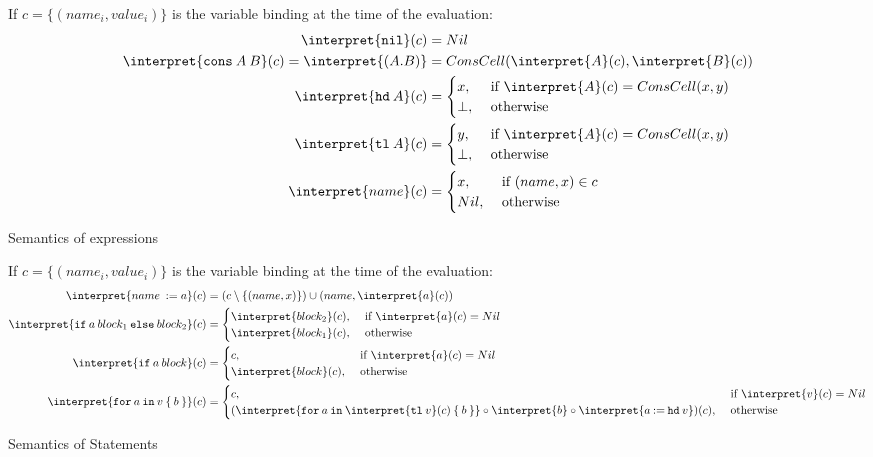 \begin{table}
	If $c = \{(name_i, value_i)\}$ is the variable binding at the time of the evaluation:
	\begin{align}
			\interpret{\mathtt{nil}}(c) &= Nil \\
			\interpret{\mathtt{cons}\: A\: B}(c)=\interpret{\mathtt{(}A\mathtt{.}B\mathtt{)}} &=  ConsCell(\interpret{A}(c), \interpret{B}(c)) \\
			\interpret{\mathtt{hd}\: A}(c) &= \begin{cases}
				x, &\text{ if }\interpret{A}(c) = ConsCell(x, y)\\
				\bot, &\text{ otherwise}
			\end{cases}\\
			\interpret{\mathtt{tl}\: A}(c) &= \begin{cases}
				y, &\text{ if }\interpret{A}(c) = ConsCell(x, y)\\
				\bot, &\text{ otherwise}
			\end{cases}\\
			\interpret{name}(c) &= \begin{cases}
				x, &\text{ if } (name, x) \in c\\
				Nil, &\text{ otherwise}
			\end{cases}
	\end{align}
	\caption{Semantics of \FOR expressions}
	\label{tab:for-sem-exp}
\end{table}
\begin{table}
	If $c = \{(name_i, value_i)\}$ is the variable binding at the time of the evaluation:
	\begin{align*}
		\interpret{name\: := a}(c) &= (c\setminus \{(name, x)\}) \cup (name, \interpret{a}(c)) \\
		\interpret{\mathtt{if}\: a\: block_1\: \mathtt{else}\: block_2}(c) &= \begin{cases}
			\interpret{block_2}(c), &\text{ if }\interpret{a}(c)= Nil\\
			\interpret{block_1}(c), &\text{ otherwise}
		\end{cases}\\
		\interpret{\mathtt{if}\: a\: block}(c) &= \begin{cases}
			c, &\text{ if }\interpret{a}(c)= Nil\\
			\interpret{block}(c), &\text{ otherwise}
		\end{cases}\\
		\interpret{\mathtt{for}\: a\:\mathtt{in}\: v\: \{\: b\: \}}(c) &= \begin{cases}
			c, &\text{ if }\interpret{v}(c) = Nil\\
			(\interpret{\mathtt{for}\: a\: \mathtt{in}\: \interpret{\mathtt{tl}\: 
		v}(c)\:\{\: b\: \}}\circ\interpret{b}\circ \interpret{a\: \mathtt{:=}\: 
		\mathtt{hd}\: v})(c), &\text{ otherwise}
		\end{cases}
	\end{align*}
	
	\caption{Semantics of \FOR Statements}
	\label{tab:for-sem-stat}
\end{table}

